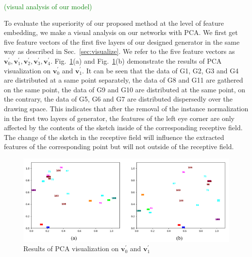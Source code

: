 \documentclass[10pt,twocolumn,letterpaper]{article}
\newcommand{\amend}[1]{\textcolor{green}{(#1)}}
\begin{document}
\amend{visual analysis of our model}

To evaluate the superiority of our proposed method at the level of feature embedding, we make a visual analysis on our networks with PCA.
We first get five feature vectors of the first five layers of our designed generator in the same way as described in Sec.~\ref{sec:visualize}. 
We refer to the five feature vectors as $\boldsymbol{v}_0^{'},\boldsymbol{v}_1^{'},\boldsymbol{v}_2^{'},\boldsymbol{v}_3^{'},\boldsymbol{v}_4^{'}$.
%
Fig.~\ref{fig:pca_1}(a) and Fig.~\ref{fig:pca_1}(b) demonstrate the results of PCA visualization on $\boldsymbol{v}_0^{'}$ and $\boldsymbol{v}_1^{'}$. 
It can be seen that the data of G1, G2, G3 and G4 are distributed at a same point separately, the data of G8 and G11 are gathered on the same point, the data of G9 and G10 are distributed at the same point, on the contrary, the data of G5, G6 and G7 are distributed dispersedly over the drawing space. 
This indicates that after the removal of the instance normalization in the first two layers of generator, the features of the left eye corner are only affected by the contents of the sketch inside of the corresponding receptive field. The change of the sketch in the receptive field will influence the extracted features of the corresponding point but will not outside of the receptive field.

\begin{figure}[htb]
	\centering
	\includegraphics[width=0.47 \textwidth]{pca_1.png}
	\caption{Results of PCA visualization on $\boldsymbol{v}_0^{'}$ and $\boldsymbol{v}_1^{'}$}
	\label{fig:pca_1}
\end{figure}

\end{document}

